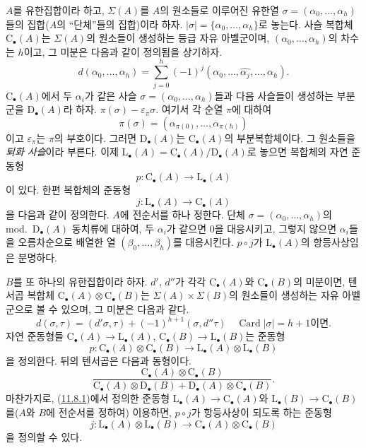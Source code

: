 \begin{env}[11.8.1]
\label{0.11.8.1-fr}
$A$를 유한집합이라 하고, $\Sigma(A)$를 $A$의 원소들로 이루어진 유한열
$\sigma=(\alpha_0,\ldots,\alpha_h)$들의 집합($A$의 ``단체''들의 집합)이라 하자.
$|\sigma|=\{\alpha_0,\ldots,\alpha_h\}$로 놓는다. 사슬 복합체
$\mathrm C_\bullet(A)$는 $\Sigma(A)$의 원소들이 생성하는 등급 자유
아벨군이며, $(\alpha_0,\ldots,\alpha_h)$의 차수는 $h$이고, 그 미분은
다음과 같이 정의됨을 상기하자.
\[
d(\alpha_0,\ldots,\alpha_h)=
\sum_{j=0}^{h}(-1)^j
(\alpha_0,\ldots,\widehat{\alpha_j},\ldots,\alpha_h).
\]
$\mathrm C_\bullet(A)$에서 두 $\alpha_i$가 같은 사슬
$\sigma=(\alpha_0,\ldots,\alpha_h)$들과 다음 사슬들이 생성하는 부분군을
$\mathrm D_\bullet(A)$라 하자.
$\pi(\sigma)-\varepsilon_\pi\sigma$. 여기서 각 순열 $\pi$에 대하여
\[
\pi(\sigma)=(\alpha_{\pi(0)},\ldots,\alpha_{\pi(h)})
\]
이고 $\varepsilon_\pi$는 $\pi$의 부호이다. 그러면
$\mathrm D_\bullet(A)$는 $\mathrm C_\bullet(A)$의 부분복합체이다. 그
원소들을 \emph{퇴화 사슬}이라 부른다. 이제
$\mathrm L_\bullet(A)=\mathrm C_\bullet(A)/\mathrm D_\bullet(A)$로 놓으면
복합체의 자연 준동형
\[
p:\mathrm C_\bullet(A)\longrightarrow\mathrm L_\bullet(A)
\]
이 있다. 한편 복합체의 준동형
\[
j:\mathrm L_\bullet(A)\longrightarrow\mathrm C_\bullet(A)
\]
을 다음과 같이 정의한다. $A$에 전순서를 하나 정한다. 단체
$\sigma=(\alpha_0,\ldots,\alpha_h)$의 mod.~$\mathrm D_\bullet(A)$ 동치류에
대하여, 두 $\alpha_i$가 같으면 $0$을 대응시키고, 그렇지 않으면
$\alpha_i$들을 오름차순으로 배열한 열 $(\beta_0,\ldots,\beta_h)$를
대응시킨다. $p\circ j$가 $\mathrm L_\bullet(A)$의 항등사상임은 분명하다.
\end{env}

\begin{env}[11.8.2]
\label{0.11.8.2-fr}
$B$를 또 하나의 유한집합이라 하자. $d'$, $d''$가 각각
$\mathrm C_\bullet(A)$와 $\mathrm C_\bullet(B)$의 미분이면, 텐서곱 복합체
$\mathrm C_\bullet(A)\otimes\mathrm C_\bullet(B)$는
$\Sigma(A)\times\Sigma(B)$의 원소들이 생성하는 자유 아벨군으로 볼 수
있으며, 그 미분은 다음과 같다.
\[
d(\sigma,\tau)=(d'\sigma,\tau)+(-1)^{h+1}(\sigma,d''\tau)
\quad\text{$\operatorname{Card}|\sigma|=h+1$이면.}
\]
자연 준동형들
$\mathrm C_\bullet(A)\to\mathrm L_\bullet(A)$,
$\mathrm C_\bullet(B)\to\mathrm L_\bullet(B)$는 준동형
\[
p:\mathrm C_\bullet(A)\otimes\mathrm C_\bullet(B)
\longrightarrow\mathrm L_\bullet(A)\otimes\mathrm L_\bullet(B)
\]
을 정의한다. 뒤의 텐서곱은 다음과 동형이다.
\[
\frac{\mathrm C_\bullet(A)\otimes\mathrm C_\bullet(B)}
{\mathrm C_\bullet(A)\otimes\mathrm D_\bullet(B)
+\mathrm D_\bullet(A)\otimes\mathrm C_\bullet(B)}.
\]
마찬가지로, (\hyperref[0.11.8.1-fr]{11.8.1})에서 정의한 준동형
$\mathrm L_\bullet(A)\to\mathrm C_\bullet(A)$와
$\mathrm L_\bullet(B)\to\mathrm C_\bullet(B)$를($A$와 $B$에 전순서를
정하여) 이용하면, $p\circ j$가 항등사상이 되도록 하는 준동형
\[
j:\mathrm L_\bullet(A)\otimes\mathrm L_\bullet(B)
\longrightarrow\mathrm C_\bullet(A)\otimes\mathrm C_\bullet(B)
\]
을 정의할 수 있다.
\end{env}

